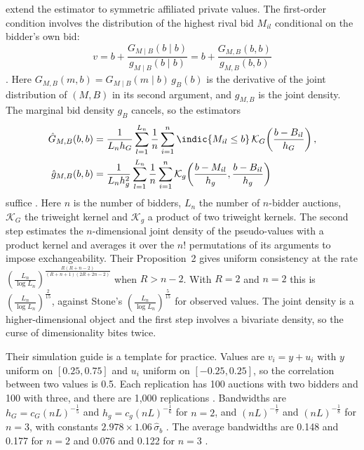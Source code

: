 \citet{LiPerrigneVuong2002} extend the estimator to symmetric affiliated private values. The first-order
condition involves the distribution of the highest rival bid $M_{il}$ conditional on the bidder's own
bid:
\begin{equation}\label{eq:A-lpv-foc}
v=b+\frac{G_{M\mid B}(b\mid b)}{g_{M\mid B}(b\mid b)}=b+\frac{G_{M,B}(b,b)}{g_{M,B}(b,b)}
\end{equation}
\citep[eq.~(4)]{LiPerrigneVuong2002}. Here $G_{M,B}(m,b)=G_{M\mid B}(m\mid b)\,g_B(b)$ is the derivative of
the joint distribution of $(M,B)$ in its second argument, and $g_{M,B}$ is the joint density.
The marginal bid density $g_B$ cancels, so the estimators
\begin{align}
\hat G_{M,B}(b,b)&=\frac{1}{L_nh_G}\sum_{l=1}^{L_n}\frac{1}{n}\sum_{i=1}^{n}\indic\{M_{il}\le b\}\,
\mathcal{K}_G\!\left(\frac{b-B_{il}}{h_G}\right),\label{eq:A-lpv-G}\\
\hat g_{M,B}(b,b)&=\frac{1}{L_nh_g^2}\sum_{l=1}^{L_n}\frac{1}{n}\sum_{i=1}^{n}
\mathcal{K}_g\!\left(\frac{b-M_{il}}{h_g},\frac{b-B_{il}}{h_g}\right)\label{eq:A-lpv-g}
\end{align}
suffice \citep[eqs.~(5)--(6)]{LiPerrigneVuong2002}. Here $n$ is the number of bidders, $L_n$ the number
of $n$-bidder auctions, $\mathcal{K}_G$ the triweight kernel and $\mathcal{K}_g$ a product of two triweight
kernels. The second step estimates the $n$-dimensional joint density of the pseudo-values with a
product kernel and averages it over the $n!$ permutations of its arguments to impose exchangeability.
Their Proposition~2 gives uniform consistency at the rate
$(\frac{L_n}{\log L_n})^{\frac{R(R+n-2)}{(R+n+1)(2R+2n-2)}}$ when $R>n-2$. With $R=2$ and $n=2$ this is
$(\frac{L_n}{\log L_n})^{\frac{2}{15}}$, against Stone's $(\frac{L_n}{\log L_n})^{\frac{5}{15}}$ for observed
values. The joint density is a higher-dimensional object and the first step involves a bivariate
density, so the curse of dimensionality bites twice.

Their simulation guide is a template for practice. Values are $v_i=y+u_i$ with $y$ uniform on
$[0.25,0.75]$ and $u_i$ uniform on $[-0.25,0.25]$, so the correlation between two values is 0.5. Each
replication has 100 auctions with two bidders and 100 with three, and there are 1,000 replications
\citep[pp.~178--179]{LiPerrigneVuong2002}. Bandwidths are $h_G=c_G(nL)^{-\frac{1}{5}}$ and
$h_g=c_g(nL)^{-\frac{1}{6}}$ for $n=2$, and $(nL)^{-\frac{1}{7}}$ and $(nL)^{-\frac{1}{8}}$ for $n=3$, with
constants $2.978\times1.06\,\hat\sigma_b$ \citep[p.~180]{LiPerrigneVuong2002}. The average bandwidths are
0.148 and 0.177 for $n=2$ and 0.076 and 0.122 for $n=3$ \citep[p.~182]{LiPerrigneVuong2002}.

